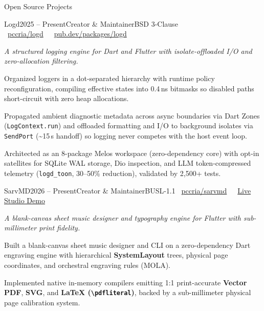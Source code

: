\documentclass[
	a4paper,
	11pt,
]{resume}
\begin{document}
\begin{rSection}{Open Source Projects}

    \begin{rSubsection}{Logd}{2025 -- Present}{Creator \& Maintainer}{BSD 3-Clause \hfill \footnotesize\textcolor{bluegray}{\faClean{\faGithubAlt}~\href{https://github.com/pccria/logd}{pccria/logd}~\textperiodcentered~\faClean{\faCube}~\href{https://pub.dev/packages/logd}{pub.dev/packages/logd}}}
        \item[] {\small\textit{A structured logging engine for Dart and Flutter with isolate-offloaded I/O and zero-allocation filtering.}}
        \item Organized loggers in a dot-separated hierarchy with runtime policy reconfiguration, compiling effective states into 0.4\,ns bitmasks so disabled paths short-circuit with zero heap allocations.
        \item Propagated ambient diagnostic metadata across async boundaries via Dart Zones (\texttt{LogContext.run}) and offloaded formatting and I/O to background isolates via \texttt{SendPort} (\textasciitilde 15\,\textmu s handoff) so logging never competes with the host event loop.
        \item Architected as an 8-package Melos workspace (zero-dependency core) with opt-in satellites for SQLite WAL storage, Dio inspection, and LLM token-compressed telemetry (\texttt{logd\_toon}, 30--50\% reduction), validated by 2,500+ tests.
        \\       
    \end{rSubsection}

    \begin{rSubsection}{SarvMD}{2026 -- Present}{Creator \& Maintainer}{BUSL-1.1 \hfill \footnotesize\textcolor{bluegray}{\faClean{\faGithubAlt}~\href{https://github.com/pccria/sarvmd}{pccria/sarvmd}~\textperiodcentered~\faClean{\faDesktop}~\href{https://pccria.github.io/sarvmd}{Live Studio Demo}}}
        \item[] {\small\textit{A blank-canvas sheet music designer and typography engine for Flutter with sub-millimeter print fidelity.}}
        \item Built a blank-canvas sheet music designer and CLI on a zero-dependency Dart engraving engine with hierarchical \textbf{SystemLayout} trees, physical page coordinates, and orchestral engraving rules (MOLA).
        \item Implemented native in-memory compilers emitting 1:1 print-accurate \textbf{Vector PDF}, \textbf{SVG}, and \textbf{LaTeX (\texttt{\textbackslash pdfliteral})}, backed by a sub-millimeter physical page calibration system.
        \\       
    \end{rSubsection}


\end{rSection}
\end{document}
